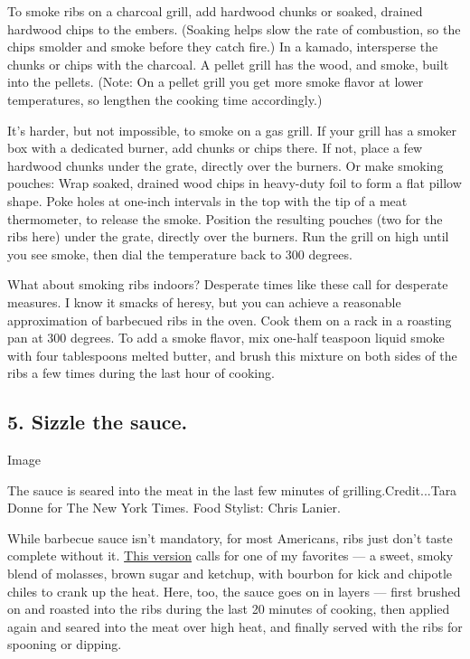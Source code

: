 To smoke ribs on a charcoal grill, add hardwood chunks or soaked,
drained hardwood chips to the embers. (Soaking helps slow the rate of
combustion, so the chips smolder and smoke before they catch fire.) In a
kamado, intersperse the chunks or chips with the charcoal. A pellet
grill has the wood, and smoke, built into the pellets. (Note: On a
pellet grill you get more smoke flavor at lower temperatures, so
lengthen the cooking time accordingly.)

It's harder, but not impossible, to smoke on a gas grill. If your grill
has a smoker box with a dedicated burner, add chunks or chips there. If
not, place a few hardwood chunks under the grate, directly over the
burners. Or make smoking pouches: Wrap soaked, drained wood chips in
heavy-duty foil to form a flat pillow shape. Poke holes at one-inch
intervals in the top with the tip of a meat thermometer, to release the
smoke. Position the resulting pouches (two for the ribs here) under the
grate, directly over the burners. Run the grill on high until you see
smoke, then dial the temperature back to 300 degrees.

What about smoking ribs indoors? Desperate times like these call for
desperate measures. I know it smacks of heresy, but you can achieve a
reasonable approximation of barbecued ribs in the oven. Cook them on a
rack in a roasting pan at 300 degrees. To add a smoke flavor, mix
one-half teaspoon liquid smoke with four tablespoons melted butter, and
brush this mixture on both sides of the ribs a few times during the last
hour of cooking.

\hypertarget{5-sizzle-the-sauce}{%
\subsection{5. Sizzle the sauce.}\label{5-sizzle-the-sauce}}

Image

The sauce is seared into the meat in the last few minutes of
grilling.Credit...Tara Donne for The New York Times. Food Stylist: Chris
Lanier.

While barbecue sauce isn't mandatory, for most Americans, ribs just
don't taste complete without it.
\href{https://cooking.nytimes.com/recipes/1021242-spice-rubbed-baby-back-ribs-with-chipotle-bourbon-barbecue-sauce}{This
version} calls for one of my favorites --- a sweet, smoky blend of
molasses, brown sugar and ketchup, with bourbon for kick and chipotle
chiles to crank up the heat. Here, too, the sauce goes on in layers ---
first brushed on and roasted into the ribs during the last 20 minutes of
cooking, then applied again and seared into the meat over high heat, and
finally served with the ribs for spooning or dipping.

